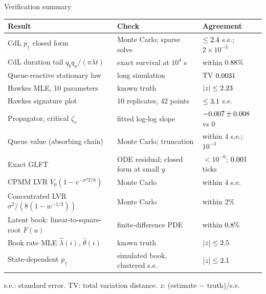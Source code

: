\begin{frame}{Verification summary}
  \footnotesize
  \begin{tabular}{p{}p{}p{}}
    \toprule
    Result & Check & Agreement \\
    \midrule
    CdL $p_\uparrow$ closed form & Monte Carlo; sparse solve & $\le2.4$ s.e.; $2\times10^{-3}$ \\
    CdL duration tail $q_bq_a/(\pi\lambda t)$ & exact survival at $10^4$ s & within $0.88\%$ \\
    Queue-reactive stationary law & long simulation & TV $0.0031$ \\
    Hawkes MLE, 10 parameters & known truth & $|z|\le2.23$ \\
    Hawkes signature plot & 10 replicates, 42 points & $\le3.1$ s.e. \\
    Propagator, critical $\zeta_c$ & fitted log-log slope & $-0.007 \pm 0.008$ vs 0 \\
    Queue value (absorbing chain) & Monte Carlo; truncation & within 4 s.e.; $10^{-3}$ \\
    Exact GLFT & ODE residual; closed form at small $y$ & $<10^{-6}$; $0.001$ ticks \\
    CPMM LVR $V_0(1-e^{-\sigma^2T/8})$ & Monte Carlo & within 4 s.e. \\
    Concentrated LVR $\sigma^2/(8(1-w^{-1/2}))$ & Monte Carlo & within 2\% \\
    Latent book: linear-to-square-root $F(u)$ & finite-difference PDE & within $0.8\%$ \\
    Book rate MLE $\hat\lambda(i)$, $\hat\theta(i)$ & known truth & $|z|\le2.5$ \\
    State-dependent $p_\uparrow$ & simulated book, clustered s.e. & $|z|\le2.1$ \\
    \bottomrule
  \end{tabular}
  \vspace{0.4em}

  s.e.: standard error. TV: total variation distance. $z$: (estimate $-$ truth)/s.e.
\end{frame}
